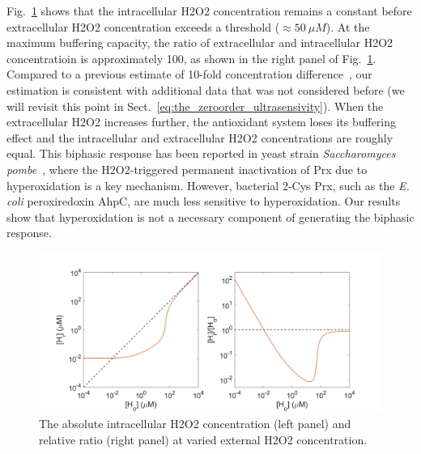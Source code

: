 \documentclass[10pt]{article}
\begin{document}
Fig.~\ref{fig:Hin_Hout_relation} shows that the intracellular H2O2 concentration remains a constant before extracellular H2O2 concentration exceeds a threshold ($\approx50~\mu M$). At the maximum buffering capacity, the ratio of extracellular and intracellular H2O2 concentratioin  is approximately 100, as shown in the right panel of Fig.~\ref{fig:Hin_Hout_relation}. Compared to a previous estimate of 10-fold concentration difference~\cite{seaver2001hydrogen}, our estimation is consistent with additional data that was not considered before (we will revisit this point in Sect.~\ref{eq:the_zeroorder_ultrasensivity}). When the extracellular H2O2 increases further, the antioxidant system loses its buffering effect and the intracellular and extracellular H2O2 concentrations are roughly equal. This biphasic response has been reported in yeast strain \textit{Saccharomyces pombe}~\cite{tomalin2016increasing}, where the H2O2-triggered permanent inactivation of Prx due to hyperoxidation is a key mechanism. However, bacterial 2-Cys Prx, such as the \textit{E. coli} peroxiredoxin AhpC, are much less sensitive to hyperoxidation. Our results show that hyperoxidation is not a necessary component of generating the biphasic response.

\begin{figure}[H]
\centering
  \includegraphics[width=0.85\linewidth]{Hin_Hout_relation.png}
  \caption{The absolute intracellular H2O2 concentration (left panel) and relative ratio (right panel) at varied external H2O2 concentration.}
  \label{fig:Hin_Hout_relation}
\end{figure}
\end{document}
